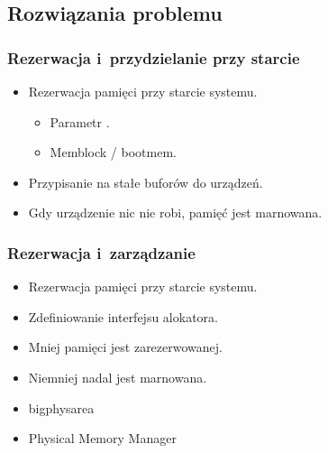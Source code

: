 
\subsection{Rozwiązania problemu}

\begin{frame}
  \frametitle{Rezerwacja i~przydzielanie przy starcie}

  \begin{itemize}
  \item Rezerwacja pamięci przy starcie systemu.
    \begin{itemize}
    \item Parametr .
    \item Memblock / bootmem.
    \end{itemize}
  \item Przypisanie na stałe buforów do urządzeń.
  \item Gdy urządzenie nic nie robi, pamięć jest marnowana.
  \end{itemize}
\end{frame}

\begin{frame}
  \frametitle{Rezerwacja i~zarządzanie}

  \begin{itemize}
  \item Rezerwacja pamięci przy starcie systemu.
  \item Zdefiniowanie interfejsu alokatora.
  \item Mniej pamięci jest zarezerwowanej.
  \item Niemniej nadal jest marnowana.
  \end{itemize}

  \begin{itemize}
  \item bigphysarea
  \item Physical Memory Manager
  \end{itemize}
\end{frame}

